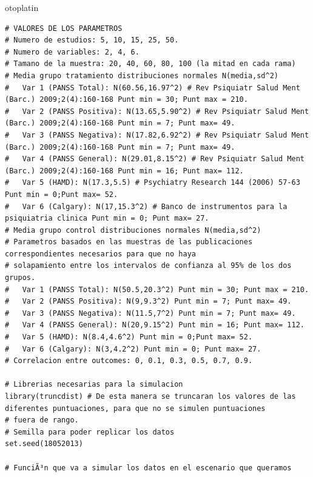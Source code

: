 otoplatin\documentclass[a4paper,openright,12pt]{report}
\begin{document}
{\begin{verbatim}
# VALORES DE LOS PARAMETROS
# Numero de estudios: 5, 10, 15, 25, 50.
# Numero de variables: 2, 4, 6.
# Tamano de la muestra: 20, 40, 60, 80, 100 (la mitad en cada rama) 
# Media grupo tratamiento distribuciones normales N(media,sd^2)
#   Var 1 (PANSS Total): N(60.56,16.97^2) # Rev Psiquiatr Salud Ment (Barc.) 2009;2(4):160-168 Punt min = 30; Punt max = 210.
#   Var 2 (PANSS Positiva): N(13.65,5.90^2) # Rev Psiquiatr Salud Ment (Barc.) 2009;2(4):160-168 Punt min = 7; Punt max= 49.
#   Var 3 (PANSS Negativa): N(17.82,6.92^2) # Rev Psiquiatr Salud Ment (Barc.) 2009;2(4):160-168 Punt min = 7; Punt max= 49.
#   Var 4 (PANSS General): N(29.01,8.15^2) # Rev Psiquiatr Salud Ment (Barc.) 2009;2(4):160-168 Punt min = 16; Punt max= 112.
#   Var 5 (HAMD): N(17.3,5.5) # Psychiatry Research 144 (2006) 57-63 Punt min = 0;Punt max= 52.
#   Var 6 (Calgary): N(17,15.3^2) # Banco de instrumentos para la psiquiatria clinica Punt min = 0; Punt max= 27.
# Media grupo control distribuciones normales N(media,sd^2)
# Parametros basados en las muestras de las publicaciones correspondientes necesarios para que no haya
# solapamiento entre los intervalos de confianza al 95% de los dos grupos.
#   Var 1 (PANSS Total): N(50.5,20.3^2) Punt min = 30; Punt max = 210.
#   Var 2 (PANSS Positiva): N(9,9.3^2) Punt min = 7; Punt max= 49.
#   Var 3 (PANSS Negativa): N(11.5,7^2) Punt min = 7; Punt max= 49.
#   Var 4 (PANSS General): N(20,9.15^2) Punt min = 16; Punt max= 112.
#   Var 5 (HAMD): N(8.4,4.6^2) Punt min = 0;Punt max= 52.
#   Var 6 (Calgary): N(3,4.2^2) Punt min = 0; Punt max= 27.
# Correlacion entre outcomes: 0, 0.1, 0.3, 0.5, 0.7, 0.9. 

# Librerias necesarias para la simulacion
library(truncdist) # De esta manera se truncaran los valores de las diferentes puntuaciones, para que no se simulen puntuaciones
# fuera de rango.
# Semilla para poder replicar los datos
set.seed(18052013)

# FunciÃ³n que va a simular los datos en el escenario que queramos


\end{verbatim}}
\end{document}
